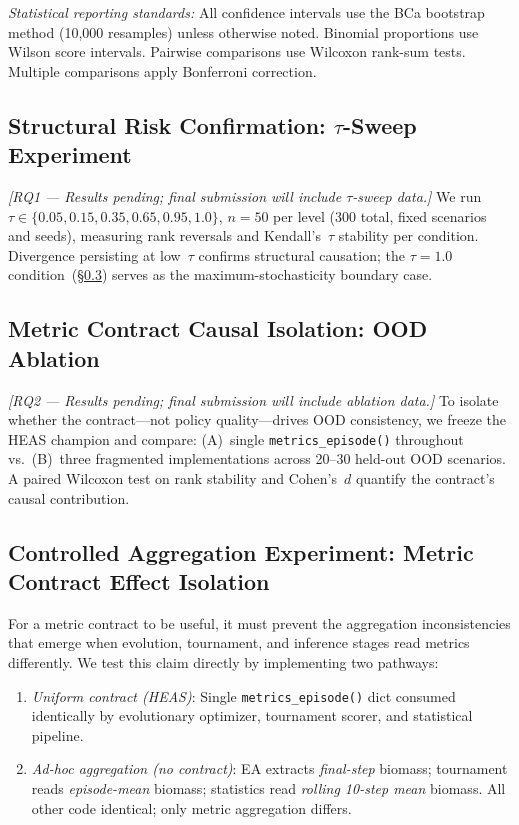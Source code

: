 \documentclass{wscpaperproc}
\begin{document}
\emph{Statistical reporting standards:} All confidence intervals use the BCa
bootstrap method (10,000 resamples) unless otherwise noted. Binomial proportions
use Wilson score intervals. Pairwise comparisons use Wilcoxon rank-sum tests.
Multiple comparisons apply Bonferroni correction.

\subsection{Structural Risk Confirmation: $\tau$-Sweep Experiment}
\label{sec:tau-sweep}

\emph{[RQ1 --- Results pending; final submission will include $\tau$-sweep data.]}
We run $\tau \in \{0.05, 0.15, 0.35, 0.65, 0.95, 1.0\}$, $n\!=\!50$ per
level (300 total, fixed scenarios and seeds), measuring rank reversals and
Kendall's~$\tau$ stability per condition. Divergence persisting at low~$\tau$
confirms structural causation; the $\tau\!=\!1.0$ condition~(\S\ref{sec:controlled-agg})
serves as the maximum-stochasticity boundary case.

\subsection{Metric Contract Causal Isolation: OOD Ablation}
\label{sec:ood-ablation}

\emph{[RQ2 --- Results pending; final submission will include ablation data.]}
To isolate whether the contract---not policy quality---drives OOD consistency,
we freeze the HEAS champion and compare: (A)~single \texttt{metrics\_episode()}
throughout vs.\ (B)~three fragmented implementations across 20--30 held-out
OOD scenarios. A paired Wilcoxon test on rank stability and Cohen's~$d$
quantify the contract's causal contribution.

\subsection{Controlled Aggregation Experiment: Metric Contract Effect Isolation}
\label{sec:controlled-agg}

For a metric contract to be useful, it must prevent the aggregation inconsistencies
that emerge when evolution, tournament, and inference stages read metrics differently.
We test this claim directly by implementing two pathways:

\begin{enumerate}
\item \emph{Uniform contract (HEAS)}: Single \texttt{metrics\_episode()} dict consumed
identically by evolutionary optimizer, tournament scorer, and statistical pipeline.
\item \emph{Ad-hoc aggregation (no contract)}: EA extracts \emph{final-step} biomass;
tournament reads \emph{episode-mean} biomass; statistics read \emph{rolling 10-step mean}
biomass. All other code identical; only metric aggregation differs.
\end{enumerate}
\end{document}
